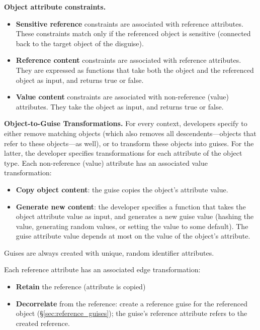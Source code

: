 \vspace{\baselineskip}
\noindent\textbf{Object attribute constraints.} 
\begin{itemize}[nosep]
\item \textbf{Sensitive reference} constraints are associated with reference attributes.
    These constraints match only if the referenced object is sensitive (\ie connected back to the target object of
    the disguise).
\item \textbf{Reference content} constraints are associated with reference attributes. They are
    expressed as functions that take both the object and the referenced object as input, and returns true or false. 
\item \textbf{Value content} constraints are associated with non-reference (value) attributes. They
    take the object as input, and returns true or false.
\end{itemize}

\vspace{\baselineskip}
\noindent\textbf{Object-to-Guise Transformations.}
For every context, developers specify to either remove matching objects (which also removes all descendents---objects that refer to these
objects---as well), or to transform these objects into guises.
For the latter, the developer specifies transformations for each
attribute of the object type.
%
Each non-reference (value) attribute has an associated value transformation:
\begin{itemize}[nosep]
    \item \textbf{Copy object content}: the guise copies the object's attribute value.
    \item \textbf{Generate new content}: the developer specifies a function that takes the object
        attribute value as input, and generates a new guise value (\eg hashing the value, generating
        random values, or setting the value to some default).
        The guise attribute value depends at most on the value of the object's attribute.
\end{itemize}
Guises are always created with unique, random identifier attributes.

\noindent Each reference attribute has an associated edge transformation:
\begin{itemize}[nosep]
    \item \textbf{Retain} the reference (attribute is copied) 
    \item \textbf{Decorrelate} from the reference: create a reference guise for the referenced
        object (\S\ref{sec:reference_guises}); the guise's reference attribute refers to the
        created reference.
\end{itemize}

